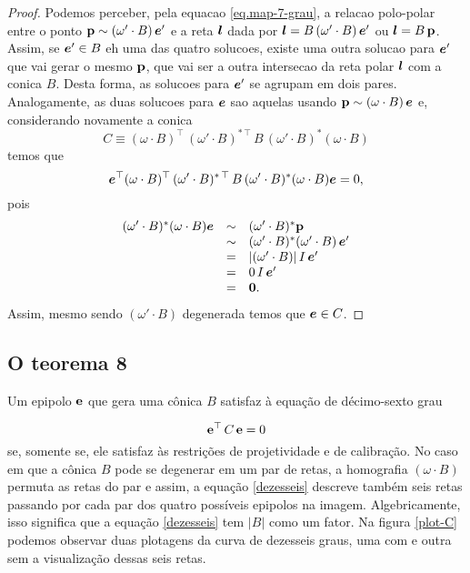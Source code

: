 \begin{proof}
 Podemos perceber, pela equacao \ref{eq.map-7-grau}, a relacao polo-polar entre o ponto ${\bf p}\sim (\omega'\cdot B)\,\boldsymbol{e}'$ e a reta $\boldsymbol{l}$ dada por $\boldsymbol{l}=B\,(\omega'\cdot B)\,\boldsymbol{e}'$ ou $\boldsymbol{l}=B\,{\bf p}$. Assim, se ${\boldsymbol{e}'}\in B$ eh uma das quatro solucoes, existe uma outra solucao para ${\boldsymbol{e}'}$ que vai gerar o mesmo ${\bf p}$, que vai ser a outra intersecao da reta polar $\boldsymbol{l}$ com a conica $B$. Desta forma, as solucoes para ${\boldsymbol{e}'}$ se agrupam em dois pares. Analogamente, as duas solucoes para ${\boldsymbol{e}}$ sao aquelas usando ${\bf p}\sim (\omega\cdot B)\,\boldsymbol{e}$ e, considerando novamente a conica 
\begin{equation*}
C \equiv (\omega \cdot B)^\top\,(\omega' \cdot B)^{*\,\top}\,B\,(\omega' \cdot B)^*(\omega \cdot B)
\end{equation*}                                      
temos que 
\begin{equation*}
\boldsymbol{e}^\top (\omega \cdot B)^\top\,(\omega' \cdot B)^{*\,\top}\,B\,(\omega' \cdot B)^*(\omega \cdot B)\boldsymbol{e}=0,
\end{equation*}                                                pois
\begin{equation*}
\begin{array}{rcl}
(\omega' \cdot B)^*(\omega \cdot B)\boldsymbol{e}&\sim &(\omega' \cdot B)^*{\bf p}\\
&\sim &(\omega' \cdot B)^*(\omega'\cdot B)\,\boldsymbol{e}'\\
&=&|(\omega' \cdot B)|\,I\,\boldsymbol{e}'\\
&=&0\,I\,\boldsymbol{e}'\\
&=&{\bf 0}.
\end{array}
\end{equation*}
Assim, mesmo sendo $(\omega' \cdot B)$ degenerada temos que $\boldsymbol{e}\in C$.                                   
\end{proof}


\subsection{O teorema 8}










Um epipolo ${\bf e}$ que gera uma cônica $B$ satisfaz à equação de décimo-sexto grau

\begin{equation}
{\bf e}^\top\,C\,{\bf e} = 0
\label{dezesseis}
\end{equation}
se, somente se, ele satisfaz às restrições de projetividade e de calibração. No caso em que a cônica $B$ pode se degenerar em um par de retas, a homografia $(\omega \cdot B)$ permuta as retas do par e assim, a equação \ref{dezesseis} descreve também seis retas passando por cada par dos quatro possíveis epipolos na imagem. Algebricamente, isso significa que a equação \ref{dezesseis} tem $|B|$ como um fator. Na figura \ref{plot-C} podemos observar duas plotagens da curva de dezesseis graus, uma com e outra sem a visualização dessas seis retas.

